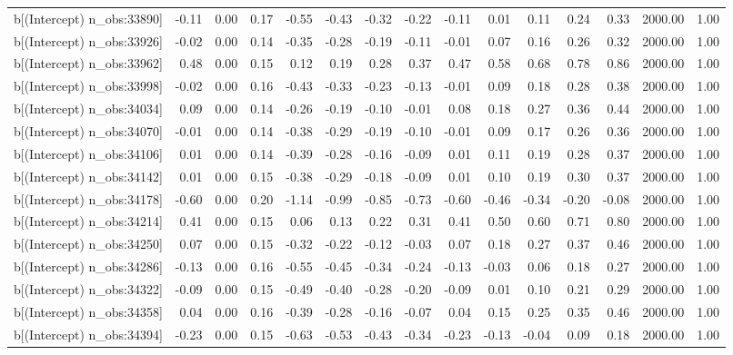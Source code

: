 \begin{table}[ht]
\begin{tabular}{rrrrrrrrrrrrrrr}
  b[(Intercept) n\_obs:33890] & -0.11 & 0.00 & 0.17 & -0.55 & -0.43 & -0.32 & -0.22 & -0.11 & 0.01 & 0.11 & 0.24 & 0.33 & 2000.00 & 1.00 \\ 
  b[(Intercept) n\_obs:33926] & -0.02 & 0.00 & 0.14 & -0.35 & -0.28 & -0.19 & -0.11 & -0.01 & 0.07 & 0.16 & 0.26 & 0.32 & 2000.00 & 1.00 \\ 
  b[(Intercept) n\_obs:33962] & 0.48 & 0.00 & 0.15 & 0.12 & 0.19 & 0.28 & 0.37 & 0.47 & 0.58 & 0.68 & 0.78 & 0.86 & 2000.00 & 1.00 \\ 
  b[(Intercept) n\_obs:33998] & -0.02 & 0.00 & 0.16 & -0.43 & -0.33 & -0.23 & -0.13 & -0.01 & 0.09 & 0.18 & 0.28 & 0.38 & 2000.00 & 1.00 \\ 
  b[(Intercept) n\_obs:34034] & 0.09 & 0.00 & 0.14 & -0.26 & -0.19 & -0.10 & -0.01 & 0.08 & 0.18 & 0.27 & 0.36 & 0.44 & 2000.00 & 1.00 \\ 
  b[(Intercept) n\_obs:34070] & -0.01 & 0.00 & 0.14 & -0.38 & -0.29 & -0.19 & -0.10 & -0.01 & 0.09 & 0.17 & 0.26 & 0.36 & 2000.00 & 1.00 \\ 
  b[(Intercept) n\_obs:34106] & 0.01 & 0.00 & 0.14 & -0.39 & -0.28 & -0.16 & -0.09 & 0.01 & 0.11 & 0.19 & 0.28 & 0.37 & 2000.00 & 1.00 \\ 
  b[(Intercept) n\_obs:34142] & 0.01 & 0.00 & 0.15 & -0.38 & -0.29 & -0.18 & -0.09 & 0.01 & 0.10 & 0.19 & 0.30 & 0.37 & 2000.00 & 1.00 \\ 
  b[(Intercept) n\_obs:34178] & -0.60 & 0.00 & 0.20 & -1.14 & -0.99 & -0.85 & -0.73 & -0.60 & -0.46 & -0.34 & -0.20 & -0.08 & 2000.00 & 1.00 \\ 
  b[(Intercept) n\_obs:34214] & 0.41 & 0.00 & 0.15 & 0.06 & 0.13 & 0.22 & 0.31 & 0.41 & 0.50 & 0.60 & 0.71 & 0.80 & 2000.00 & 1.00 \\ 
  b[(Intercept) n\_obs:34250] & 0.07 & 0.00 & 0.15 & -0.32 & -0.22 & -0.12 & -0.03 & 0.07 & 0.18 & 0.27 & 0.37 & 0.46 & 2000.00 & 1.00 \\ 
  b[(Intercept) n\_obs:34286] & -0.13 & 0.00 & 0.16 & -0.55 & -0.45 & -0.34 & -0.24 & -0.13 & -0.03 & 0.06 & 0.18 & 0.27 & 2000.00 & 1.00 \\ 
  b[(Intercept) n\_obs:34322] & -0.09 & 0.00 & 0.15 & -0.49 & -0.40 & -0.28 & -0.20 & -0.09 & 0.01 & 0.10 & 0.21 & 0.29 & 2000.00 & 1.00 \\ 
  b[(Intercept) n\_obs:34358] & 0.04 & 0.00 & 0.16 & -0.39 & -0.28 & -0.16 & -0.07 & 0.04 & 0.15 & 0.25 & 0.35 & 0.46 & 2000.00 & 1.00 \\ 
  b[(Intercept) n\_obs:34394] & -0.23 & 0.00 & 0.15 & -0.63 & -0.53 & -0.43 & -0.34 & -0.23 & -0.13 & -0.04 & 0.09 & 0.18 & 2000.00 & 1.00 \\ 

\end{tabular}
\end{table}
